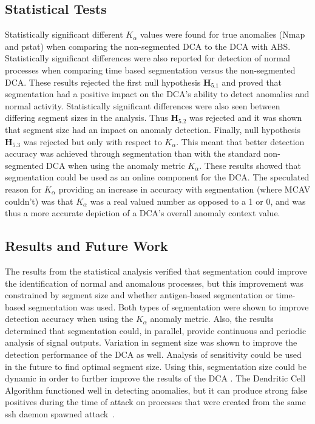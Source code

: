 \documentclass{umm-senior-sem}
\begin{document}
\subsection{Statistical Tests}
\label{sec:stats}
Statistically significant different $K_\alpha$ values were found for true anomalies (Nmap and pstat) when comparing the non-segmented DCA to the DCA with ABS. Statistically significant differences were also reported for detection of normal processes when comparing time based segmentation versus the non-segmented DCA. These results rejected the first null hypothesis $\textbf{H}_{5.1}$ and proved that segmentation had a positive impact on the DCA's ability to detect anomalies and normal activity. Statistically significant differences were also seen between differing segment sizes in the analysis. Thus $\textbf{H}_{5.2}$ was rejected and it was shown that segment size had an impact on anomaly detection. Finally, null hypothesis $\textbf{H}_{5.3}$ was rejected but only with respect to $K_\alpha$. This meant that better detection accuracy was achieved through segmentation than with the standard non-segmented DCA when using the anomaly metric $K_\alpha$. These results showed that segmentation could be used as an online component for the DCA. The speculated reason for $K_\alpha$ providing an increase in accuracy with segmentation (where MCAV couldn't) was that $K_\alpha$ was a real valued number as opposed to a 1 or 0, and was thus a more accurate depiction of a DCA's overall anomaly context value.

\subsection{Results and Future Work}
The results from the statistical analysis verified that segmentation could improve the identification of normal and anomalous processes, but this improvement was constrained by segment size and whether antigen-based segmentation or time-based segmentation was used. Both types of segmentation were shown to improve detection accuracy when using the $K_\alpha$ anomaly metric. Also, the results determined that segmentation could, in parallel, provide continuous and periodic analysis of signal outputs. Variation in segment size was shown to improve the detection performance of the DCA as well. Analysis of sensitivity could be used in the future to find optimal segment size. Using this, segmentation size could be dynamic in order to further improve the results of the DCA
\cite{guSeg:2011}.
The Dendritic Cell Algorithm functioned well in detecting anomalies, but it can produce strong false positives during the time of attack on processes that were created from the same ssh daemon spawned attack~\cite{greensmith_thesis:2007}.
\end{document}

